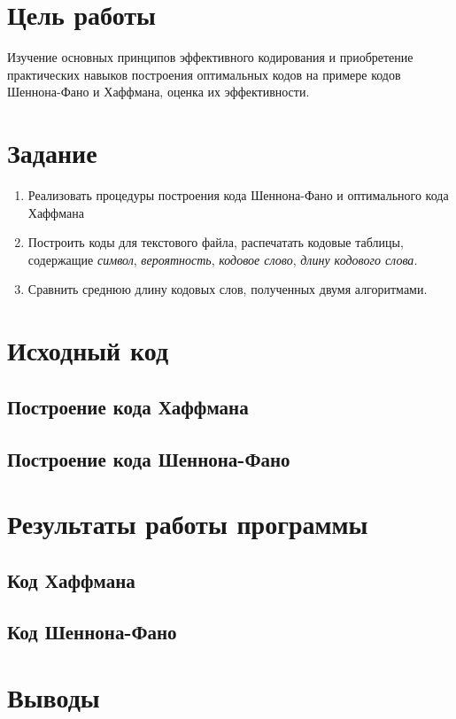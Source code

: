 \documentclass[listings]{labreport}
\begin{document}
\maketitlepage

\section*{Цель работы}

Изучение основных принципов эффективного кодирования и приобретение
практических навыков построения оптимальных кодов на примере
кодов Шеннона-Фано и Хаффмана, оценка их эффективности.

\section*{Задание}

\begin{enumerate}
\item Реализовать процедуры построения кода Шеннона-Фано и оптимального кода Хаффмана 
\item Построить коды для текстового файла, распечатать кодовые таблицы, содержащие
\textit{символ}, \textit{вероятность}, \textit{кодовое слово},
\textit{длину кодового слова}.
\item Сравнить среднюю длину кодовых слов, полученных двумя алгоритмами.
\end{enumerate}

\section*{Исходный код}

\subsection*{Построение кода Хаффмана}


\subsection*{Построение кода Шеннона-Фано}


\section*{Результаты работы программы}


\subsection*{Код Хаффмана}

\noindent
{}

\subsection*{Код Шеннона-Фано}

\noindent
{}

\section*{Выводы}
\end{document}

